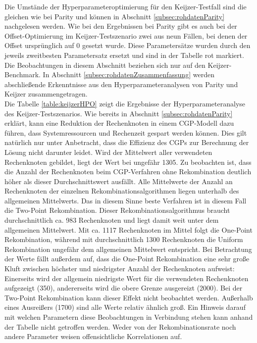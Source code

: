 Die Umstände der Hyperparameteroptimierung für den Keijzer-Testfall sind die gleichen wie bei Parity und können in Abschnitt \ref{subsec:rohdatenParity} nachgelesen werden.
Wie bei den Ergebnissen bei Parity gibt es auch bei der Offset-Optimierung im Keijzer-Testszenario zwei aus neun Fällen, bei denen der Offset ursprünglich auf 0 gesetzt wurde.
Diese Parametersätze wurden durch den jeweils zweitbesten Parametersatz ersetzt und sind in der Tabelle rot markiert.
Die Beobachtungen in diesem Abschnitt beziehen sich nur auf den Keijzer-Benchmark.
In Abschnitt \ref{subsec:rohdatenZusammenfassung} werden abschließende Erkenntnisse aus den Hyperparameteranalysen von Parity und Keijzer zusammengetragen.\\
Die Tabelle \ref{table:keijzerHPO} zeigt die Ergebnisse der Hyperparameteranalyse des Keijzer-Test\-sze\-narios.
Wie bereits in Abschnitt \ref{subsec:rohdatenParity} erklärt, kann eine Reduktion der Rechenknoten in einem CGP-Modell dazu führen, dass Systemressourcen und Rechenzeit gespart werden können.
Dies gilt natürlich nur unter Anbetracht, dass die Effizienz des CGPs zur Berechnung der Lösung nicht darunter leidet.
Wird der Mittelwert aller verwendeten Rechenknoten gebildet, liegt der Wert bei ungefähr 1305. 
Zu beobachten ist, dass die Anzahl der Rechenknoten beim CGP-Verfahren ohne Rekombination deutlich höher als dieser Durchschnittswert ausfällt.
Alle Mittelwerte der Anzahl an Rechenknoten der einzelnen Rekombinationsalgorithmen liegen unterhalb des allgemeinen Mittelwerts.
Das in diesem Sinne beste Verfahren ist in diesem Fall die Two-Point Rekombination.
Dieser Rekombinationsalgorithmus braucht durchschnittlich ca. 983 Rechenknoten und liegt damit weit unter dem allgemeinen Mittelwert.
Mit ca. 1117 Rechenknoten im Mittel folgt die One-Point Rekombination, während mit durchschnittlich 1300 Rechenknoten die Uniform Rekombination ungefähr dem allgemeinen Mittelwert entspricht.
Bei Betrachtung der Werte fällt außerdem auf, dass die One-Point Rekombination eine sehr große Kluft zwischen höchster und niedrigster Anzahl der Rechenknoten aufweist:
Einerseits wird der allgemein niedrigste Wert für die verwendeten Rechenknoten aufgezeigt (350), andererseits wird die obere Grenze ausgereizt (2000).
Bei der Two-Point Rekombination kann dieser Effekt nicht beobachtet werden.
Außerhalb eines Ausreißers (1700) sind alle Werte relativ ähnlich groß.
Ein Hinweis darauf mit welchen Parametern diese Beobachtungen in Verbindung stehen kann anhand der Tabelle nicht getroffen werden.
Weder von der Rekombinationsrate noch andere Parameter weisen offensichtliche Korrelationen auf.
